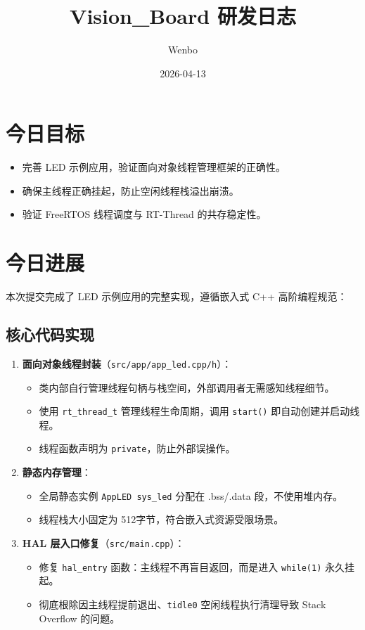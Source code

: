 \documentclass[cn, chinesefont=nofont, color=black, device=normal, 11pt]{elegantnote}
\title{Vision\_Board 研发日志}
\author{Wenbo}
\date{2026-04-13}
\begin{document}
\maketitle

\section{今日目标}
\begin{itemize}
    \item 完善 LED 示例应用，验证面向对象线程管理框架的正确性。
    \item 确保主线程正确挂起，防止空闲线程栈溢出崩溃。
    \item 验证 FreeRTOS 线程调度与 RT-Thread 的共存稳定性。
\end{itemize}

\section{今日进展}
本次提交完成了 LED 示例应用的完整实现，遵循嵌入式 C++ 高阶编程规范：

\subsection{核心代码实现}
\begin{enumerate}
    \item \textbf{面向对象线程封装}（\texttt{src/app/app\_led.cpp/h}）：
          \begin{itemize}
              \item 类内部自行管理线程句柄与栈空间，外部调用者无需感知线程细节。
              \item 使用 \texttt{rt\_thread\_t} 管理线程生命周期，调用 \texttt{start()} 即自动创建并启动线程。
              \item 线程函数声明为 \texttt{private}，防止外部误操作。
          \end{itemize}
    \item \textbf{静态内存管理}：
          \begin{itemize}
              \item 全局静态实例 \texttt{AppLED sys\_led} 分配在 .bss/.data 段，不使用堆内存。
              \item 线程栈大小固定为 512字节，符合嵌入式资源受限场景。
          \end{itemize}
    \item \textbf{HAL 层入口修复}（\texttt{src/main.cpp}）：
          \begin{itemize}
              \item 修复 \texttt{hal\_entry} 函数：主线程不再盲目返回，而是进入 \texttt{while(1)} 永久挂起。
              \item 彻底根除因主线程提前退出、\texttt{tidle0} 空闲线程执行清理导致 Stack Overflow 的问题。
          \end{itemize}
\end{enumerate}
\end{document}
